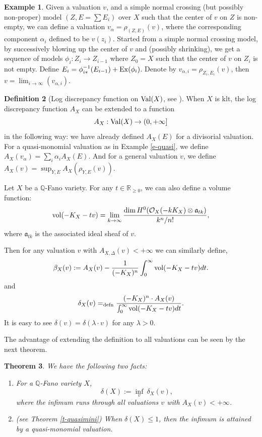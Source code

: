 \documentclass[12pt,reqno]{amsart}%
\newtheorem{thm}{Theorem}[section]
\theoremstyle{definition}
\newtheorem{defn}[thm]{Definition}
\newtheorem{exmp}[thm]{Example}
\theoremstyle{remark}
\newcommand{\Val}{{\rm Val}}
\newcommand{\vol}{{\rm vol}}
\newcommand{\fa}{{\mathfrak{a}}}
\newcommand{\bQ}{{\mathbb{Q}}}
\begin{document}
\begin{subappendices}
\begin{exmp}Given a valuation $v$, and a simple normal crossing (but possibly non-proper) model $(Z,E=\sum E_i)$ over $X$ such that the center of $v$ on $Z$ is non-empty, we can define a valuation $v_{\alpha}=\rho_{(Z,E)}(v)$, where the corresponding component  $\alpha_i$ defined to be $v(z_i)$. Started from a simple normal crossing model, by successively blowing up the center of $v$ and (possibly shrinking), we get a sequence of models $\phi_i\colon Z_i\to Z_{i-1}$ where $Z_0=  X $ such that the center of $v$ on $Z_i$ is not empty. Define $E_i=\phi^{-1}_{i*}(E_{i-1})+{\rm Ex}(\phi_i)$. Denote by $v_{\alpha,i}=\rho_{Z_i,E_i}(v)$, then $v=\lim_{i\to \infty}(v_{\alpha,i})$.
\end{exmp}

\begin{defn}[{Log discrepancy function on $\Val(X)$, see \cite{JM12,BdFFU15}}] When $X$ is klt, the log discrepancy function $A_{X}$ can be extended to a function 
$$A_{X}: \Val(X)\to (0, +\infty]$$
in the following way: we have already defined $A_{X}(E)$ for a divisorial valuation. For a quasi-monomial valuation as in Example \ref{e-quasi}, we define 
$A_{X}(v_{\alpha})=\sum_i \alpha_iA_{X}(E)$.  And for a general valuation $v$, we define $A_{X}(v)=\sup_{Y,E} A_{X}(\rho_{Y,E}(v))$.

\end{defn}





Let $X$ be a $\bQ$-Fano variety. For any $t\in \mathbb{R}_{\ge 0}$, we can also define a volume function:
$$\vol(-K_X-tv)=\lim_{k\to  \infty}\frac{\dim H^0(\mathcal{O}_X(-kK_X)\otimes \fa_{tk})}{k^n/n!},$$
where $\fa_{tk}$ is the associated ideal sheaf of $v$.



Then for any valuation $v$ with $A_{X,\Delta}(v)< +\infty$ we can similarly define,
$$\beta_{X}(v) :=   A_{X}(v) -\frac{1}{(-K_X)^n} \int^{\infty}_{0}\vol(-K_X-tv)dt.$$
and
$$
\delta_X(v)=_{\rm defn}\frac{(-K_X)^n \cdot A_{X}(v)}{ \int^{\infty}_{0}\vol(-K_X-tv)dt}.
$$
It is easy to see $\delta(v)=\delta(\lambda\cdot v)$ for any $\lambda>0$. 

The advantage of extending the definition to all valuations can be seen by the next theorem. 
\begin{thm}\label{t-deltaquasi}
We have the following two facts:
\begin{enumerate}
\item  {\cite{BJ20}} For a $\mathbb{Q}$-Fano variety $X$, 
$$ \delta(X):=\inf_v \ \delta_X(v),$$
where the infimum runs through all valuations $v$ with $A_X(v)<+\infty$.
\item \cite{BLX19} (see Theorem \ref{t-quasimini}) When $\delta(X)\le 1$, then the infimum is attained by a quasi-monomial valuation.
\end{enumerate}
\end{thm}


\end{subappendices}
\end{document}
